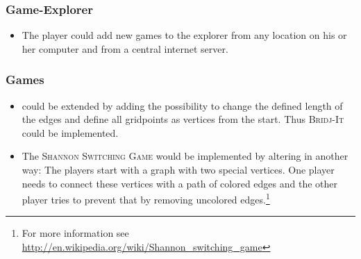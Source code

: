 \subsubsection{Game-Explorer}
\begin{itemize}

	\item The player could add new games to the explorer from any location on his or her computer and from a central internet server.

\end{itemize}

\subsubsection{Games}
\begin{itemize}
	\item \twixt could be extended by adding the possibility to change the defined length of the edges and define all gridpoints as vertices from the start. Thus \textsc{Bridj-It} could be implemented.
	\item The \textsc{Shannon Switching Game} would be implemented by altering \twixt in another way: The players start with a graph with two special vertices. One player needs to connect these vertices with a path of colored edges and the other player tries to prevent that by removing uncolored edges.\footnote{For more information see \url{http://en.wikipedia.org/wiki/Shannon_switching_game}}
\end{itemize}